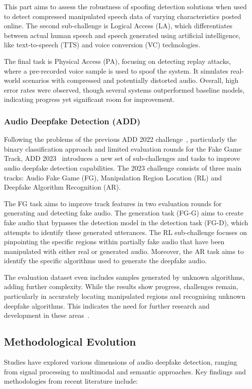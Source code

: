 \documentclass{Interspeech}
\begin{document}
This part aims to assess the robustness of spoofing detection solutions when
used to detect compressed manipulated speech data of varying characteristics
posted online. The second sub-challenge is Logical Access (LA), which
differentiates between actual human speech and speech generated using
artificial intelligence, like text-to-speech (TTS) and voice conversion (VC)
technologies.

The final task is Physical Access (PA), focusing on detecting replay attacks,
where a pre-recorded voice sample is used to spoof the system. It simulates
real-world scenarios with compressed and potentially distorted audio. Overall,
high error rates were observed, though several systems outperformed baseline
models, indicating progress yet significant room for improvement.

\subsubsection{Audio Deepfake Detection (ADD)}
Following the problems of the previous ADD 2022 challenge~\cite{yi2022add},
particularly the binary classification approach and limited evaluation rounds
for the Fake Game Track, ADD 2023~\cite{yi2023add} introduces a new set of
sub-challenges and tasks to improve audio deepfake detection capabilities. The
2023 challenge consists of three main tracks: Audio Fake Game (FG),
Manipulation Region Location (RL) and Deepfake Algorithm Recognition (AR).

The FG task aims to improve track features in two evaluation rounds for
generating and detecting fake audio. The generation task (FG-G) aims to create
fake audio that bypasses the detection model in the detection task (FG-D),
which attempts to identify these generated utterances. The RL sub-challenge
focuses on pinpointing the specific regions within partially fake audio that
have been manipulated with either real or generated audio. Moreover, the AR
task aims to identify the specific algorithms used to generate the deepfake
audio.

The evaluation dataset even includes samples generated by unknown algorithms,
adding further complexity. While the results show progress, challenges remain,
particularly in accurately locating manipulated regions and recognising unknown
deepfake algorithms. This indicates the need for further research and
development in these areas~\cite{zeng2023deepfake}.

\subsection{Methodological Evolution}
Studies have explored various dimensions of audio deepfake detection, ranging
from signal processing to multimodal and semantic approaches. Key findings and
methodologies from recent literature include:
\end{document}

